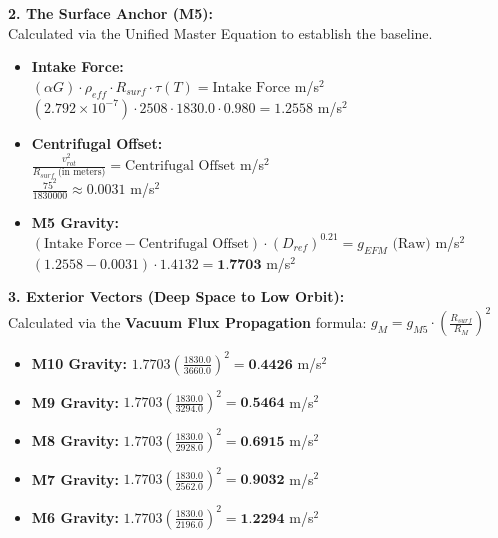 \documentclass[11pt, a4paper]{article}
\begin{document}
  \vspace{1.0em}
  \noindent \textbf{2. The Surface Anchor (M5):} \\
  \hspace*{1em} Calculated via the Unified Master Equation to establish the baseline.
  \begin{itemize}
    \item \textbf{Intake Force:} \\[0.5em]
    \hspace*{2em} $(\alpha G) \cdot \rho_{eff} \cdot R_{surf} \cdot \tau(T) = \text{Intake Force}$ m/s$^2$ \\[1em]
    \hspace*{2em} $(2.792 \times 10^{-7}) \cdot 2508 \cdot 1830.0 \cdot 0.980 = 1.2558$ m/s$^2$
    
    \item \textbf{Centrifugal Offset:} \\[0.5em]
    \hspace*{2em} $\frac{v_{rot}^2}{R_{surf} \text{ (in meters)}} = \text{Centrifugal Offset}$ m/s$^2$ \\[1em]
    \hspace*{2em} $\frac{75^2}{1830000} \approx 0.0031$ m/s$^2$
    
    \item \textbf{M5 Gravity:} \\[0.5em]
    \hspace*{2em} $(\text{Intake Force} - \text{Centrifugal Offset}) \cdot (D_{ref})^{0.21} = g_{EFM} \text{ (Raw)}$ m/s$^2$ \\[1em]
    \hspace*{2em} $(1.2558 - 0.0031) \cdot 1.4132 = \textbf{1.7703}$ m/s$^2$
  \end{itemize}

  \clearpage
  \noindent \textbf{3. Exterior Vectors (Deep Space to Low Orbit):} \\
  \hspace*{1em} Calculated via the \textbf{Vacuum Flux Propagation} formula: $g_M = g_{M5} \cdot \left( \frac{R_{surf}}{R_M} \right)^2$
  \begin{itemize}
    \item \textbf{M10 Gravity:} $1.7703 \left( \frac{1830.0}{3660.0} \right)^2 = \textbf{0.4426}$ m/s$^2$
    \item \textbf{M9 Gravity:} $1.7703 \left( \frac{1830.0}{3294.0} \right)^2 = \textbf{0.5464}$ m/s$^2$
    \item \textbf{M8 Gravity:} $1.7703 \left( \frac{1830.0}{2928.0} \right)^2 = \textbf{0.6915}$ m/s$^2$
    \item \textbf{M7 Gravity:} $1.7703 \left( \frac{1830.0}{2562.0} \right)^2 = \textbf{0.9032}$ m/s$^2$
    \item \textbf{M6 Gravity:} $1.7703 \left( \frac{1830.0}{2196.0} \right)^2 = \textbf{1.2294}$ m/s$^2$
  \end{itemize}
\end{document}
